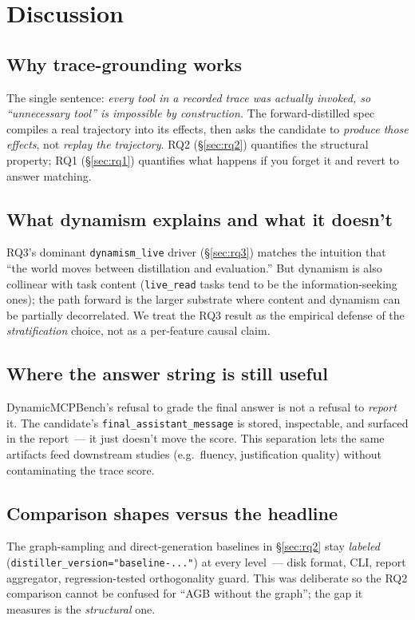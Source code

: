 \section{Discussion}
\label{sec:discussion}

\subsection{Why trace-grounding works}

The single sentence: \emph{every tool in a recorded trace was actually
invoked, so ``unnecessary tool'' is impossible by construction.} The
forward-distilled spec compiles a real trajectory into its effects,
then asks the candidate to \emph{produce those effects}, not
\emph{replay the trajectory}. RQ2 (\S\ref{sec:rq2}) quantifies the
structural property; RQ1 (\S\ref{sec:rq1}) quantifies what happens if
you forget it and revert to answer matching.

\subsection{What dynamism explains and what it doesn't}

RQ3's dominant \texttt{dynamism\_live} driver
(\S\ref{sec:rq3}) matches the intuition that ``the world moves between
distillation and evaluation.'' But dynamism is also collinear with
task content (\texttt{live\_read} tasks tend to be the
information-seeking ones); the path forward is the larger substrate
where content and dynamism can be partially decorrelated. We treat
the RQ3 result as the empirical defense of the \emph{stratification}
choice, not as a per-feature causal claim.

\subsection{Where the answer string is still useful}

DynamicMCPBench's refusal to grade the final answer is not a refusal to
\emph{report} it. The candidate's
\texttt{final\_assistant\_message} is stored, inspectable, and surfaced
in the report~--- it just doesn't move the score. This separation lets
the same artifacts feed downstream studies (e.g.\ fluency, justification
quality) without contaminating the trace score.

\subsection{Comparison shapes versus the headline}

The graph-sampling and direct-generation baselines in \S\ref{sec:rq2}
stay \emph{labeled} (\texttt{distiller\_version="baseline-..."}) at
every level~--- disk format, CLI, report aggregator, regression-tested
orthogonality guard. This was deliberate so the RQ2 comparison cannot
be confused for ``AGB without the graph''; the gap it measures is the
\emph{structural} one.
